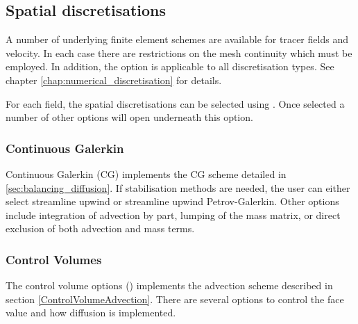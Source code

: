 \subsection{Spatial discretisations}\label{sec:Spatial discretisations}

A number of underlying finite element schemes are available for tracer
fields and velocity. In each case there are restrictions on the mesh
continuity which must be employed. In addition, the \onlypdf\linebreak
{} option is applicable to all discretisation
types. See chapter \ref{chap:numerical_discretisation} for details.

For each field, the spatial discretisations can be selected using
.  Once selected a number
of other options will open underneath this option.

\subsubsection{Continuous Galerkin}
\label{sec:configuring_fluidity_continuous_galerkin}

Continuous Galerkin (CG) implements the CG scheme detailed in \ref{sec:balancing_diffusion}. If stabilisation methods are needed, the user can either select streamline upwind or streamline upwind Petrov-Galerkin. Other options include integration of advection by part, lumping of the mass matrix, or direct exclusion of both advection and mass terms.

\subsubsection{Control Volumes}\label{sec:CVs}

The control volume options () implements the advection scheme described in section \ref{ControlVolumeAdvection}. There are 
several options to control the face value and how diffusion is implemented.

